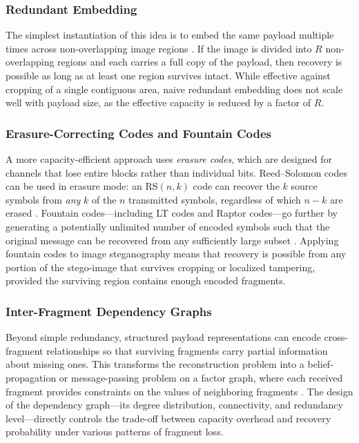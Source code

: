 \documentclass[12pt,a4paper,oneside]{report}
\begin{document}
	\subsubsection{Redundant Embedding}
	
	The simplest instantiation of this idea is to embed the same payload multiple times
	across non-overlapping image regions \cite{johnson1998exploring}.
	If the image is divided into $R$ non-overlapping regions and each carries a full copy
	of the payload, then recovery is possible as long as at least one region survives intact.
	While effective against cropping of a single contiguous area, naive redundant embedding
	does not scale well with payload size, as the effective capacity is reduced by a factor
	of $R$.
	
	\subsubsection{Erasure-Correcting Codes and Fountain Codes}
	
	A more capacity-efficient approach uses \emph{erasure codes}, which are designed for
	channels that lose entire blocks rather than individual bits.
	Reed–Solomon codes can be used in erasure mode: an RS$(n,k)$ code can recover the $k$
	source symbols from \emph{any} $k$ of the $n$ transmitted symbols, regardless of which
	$n-k$ are erased \cite{proakis2008digital}.
	Fountain codes—including LT codes and Raptor codes—go further by generating a
	potentially unlimited number of encoded symbols such that the original message can be
	recovered from any sufficiently large subset \cite{proakis2008digital}.
	Applying fountain codes to image steganography means that recovery is possible from any
	portion of the stego-image that survives cropping or localized tampering, provided
	the surviving region contains enough encoded fragments.
	
	\subsubsection{Inter-Fragment Dependency Graphs}
	
	Beyond simple redundancy, structured payload representations can encode cross-fragment
	relationships so that surviving fragments carry partial information about missing ones.
	This transforms the reconstruction problem into a belief-propagation or message-passing
	problem on a factor graph, where each received fragment provides constraints on the
	values of neighboring fragments \cite{cox2007digital}.
	The design of the dependency graph—its degree distribution, connectivity, and
	redundancy level—directly controls the trade-off between capacity overhead and
	recovery probability under various patterns of fragment loss.
	
\end{document}
